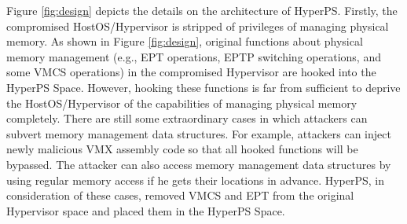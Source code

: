 Figure \ref{fig:design} depicts the details on the architecture of HyperPS. 
Firstly, the compromised HostOS/Hypervisor is stripped of privileges of managing physical memory. 
As shown in Figure \ref{fig:design}, original functions about physical memory management (e.g., EPT operations, EPTP switching operations, and some VMCS operations) in the compromised Hypervisor are hooked into the HyperPS Space. 
However, hooking these functions is far from sufficient to deprive the HostOS/Hypervisor of the capabilities of managing physical memory completely.
There are still some extraordinary cases in which attackers can subvert memory management data structures. For example, attackers can inject newly malicious VMX assembly code so that all hooked functions will be bypassed. The attacker can also access memory management data structures by using regular memory access if he gets their locations in advance.
HyperPS, in consideration of these cases, removed VMCS and EPT from the original Hypervisor space and placed them in the HyperPS Space. 

